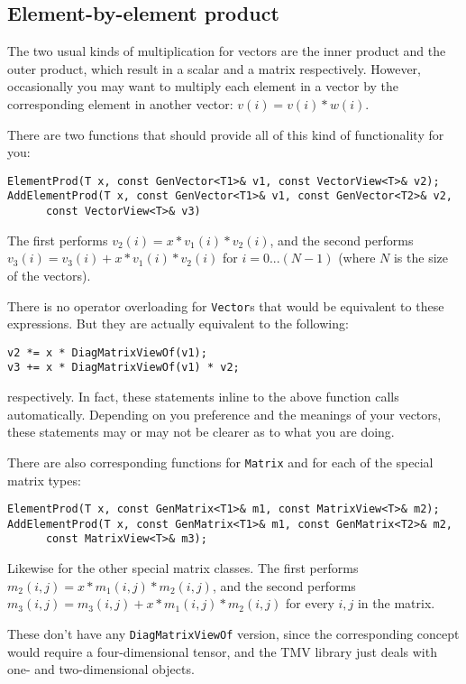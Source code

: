 \documentclass[twoside,letterpaper,11pt]{article}
\renewcommand{\tt}[1]{{\texttt {#1}}}
\begin{document}
\subsection{Element-by-element product}

The two usual kinds of multiplication for vectors are the inner product and 
the outer product, which result in a scalar and a matrix respectively.
However, occasionally you may want to multiply each element in a vector by the
corresponding element in another vector: $v(i) = v(i) * w(i)$.

There are two functions that should provide all of this kind of functionality
for you:
\begin{verbatim}
ElementProd(T x, const GenVector<T1>& v1, const VectorView<T>& v2);
AddElementProd(T x, const GenVector<T1>& v1, const GenVector<T2>& v2,
      const VectorView<T>& v3)
\end{verbatim}
The first performs $v_2(i) = x * v_1(i) * v_2(i)$, and the second performs
$v_3(i) = v_3(i) + x * v_1(i) * v_2(i)$ for $i = 0 ... (N-1)$ (where $N$ is the 
size of the vectors).

There is no operator overloading for \tt{Vector}s that would be equivalent to 
these expressions.
But they are actually equivalent to the following:
\begin{verbatim}
v2 *= x * DiagMatrixViewOf(v1);
v3 += x * DiagMatrixViewOf(v1) * v2;
\end{verbatim}
respectively.  In fact, these statements inline to the above function calls
automatically.  Depending on you preference and the meanings of your vectors,
these statements may or may not be clearer as to what you are doing.

There are also corresponding functions for \tt{Matrix} and for each of the special
matrix types:
\begin{verbatim}
ElementProd(T x, const GenMatrix<T1>& m1, const MatrixView<T>& m2);
AddElementProd(T x, const GenMatrix<T1>& m1, const GenMatrix<T2>& m2,
      const MatrixView<T>& m3);
\end{verbatim}
Likewise for the other special matrix classes.  The first performs 
$m_2(i,j) = x * m_1(i,j) * m_2(i,j)$, and the second performs
$m_3(i,j) = m_3(i,j) + x * m_1(i,j) * m_2(i,j)$ for every $i,j$ in the matrix.

These don't have any \tt{DiagMatrixViewOf} version, since the corresponding 
concept would require a four-dimensional tensor, and the TMV library
just deals with one- and two-dimensional objects.
\end{document}
